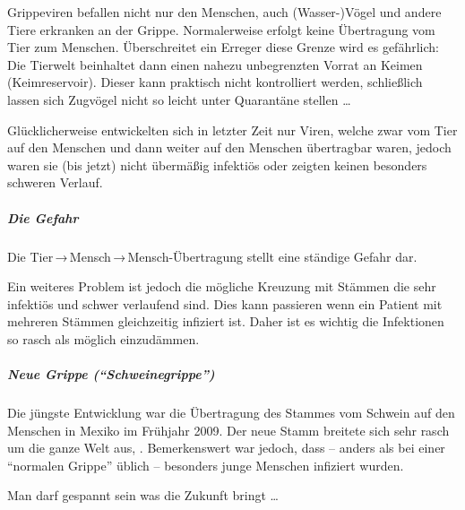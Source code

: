 {
Grippeviren befallen nicht nur den Menschen, auch
(Wasser-)Vögel und andere Tiere erkranken an der Grippe.
Normalerweise erfolgt keine Übertragung vom Tier zum
Menschen. Überschreitet ein Erreger diese Grenze wird es
gefährlich: Die Tierwelt beinhaltet dann einen nahezu
unbegrenzten Vorrat an Keimen (Keimreservoir). Dieser kann 
praktisch nicht kontrolliert werden, schließlich lassen
sich Zugvögel nicht so leicht unter Quarantäne stellen
\ldots 

Glücklicherweise entwickelten sich in letzter Zeit nur
Viren, welche zwar vom Tier auf den Menschen und dann
weiter auf den Menschen übertragbar waren, jedoch waren sie
(bis jetzt) nicht übermäßig infektiös oder zeigten keinen
besonders schweren Verlauf. 

\subparagraph{Die Gefahr} Die
Tier\,→\,Mensch\,→\,Mensch-Übertragung stellt eine ständige
Gefahr dar. 

Ein weiteres Problem ist jedoch die mögliche Kreuzung
mit Stämmen die sehr infektiös und schwer verlaufend sind. Dies kann passieren wenn ein
Patient mit mehreren Stämmen gleichzeitig infiziert ist.
Daher ist es wichtig die Infektionen so rasch als möglich
einzudämmen. 
}
{
}
{}
{}
{}




\subparagraph{Neue Grippe ("`Schweinegrippe"')} Die jüngste
Entwicklung war die Übertragung des Stammes 
vom Schwein auf den Menschen in Mexiko im Frühjahr 2009. Der
neue Stamm breitete sich sehr rasch um die ganze Welt aus,
. Bemerkenswert
war jedoch, dass -- anders als bei einer "`normalen
Grippe"' üblich -- besonders junge Menschen infiziert wurden. 

Man darf gespannt sein was die Zukunft bringt \ldots

% 
% 

